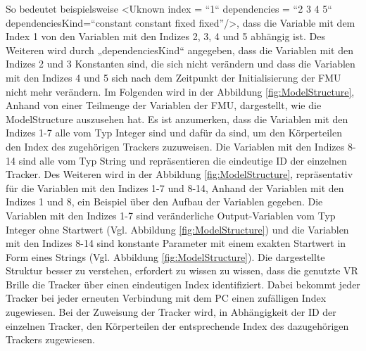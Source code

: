 So bedeutet beispielsweise <Uknown index  = “1“ dependencies = “2 3 4 5“ dependenciesKind=“constant constant fixed fixed”/>, dass die Variable mit dem Index 1 von den Variablen mit den Indizes 2, 3, 4 und 5 abhängig ist. Des Weiteren wird durch „dependenciesKind“ angegeben, dass die Variablen mit den Indizes 2 und 3 Konstanten sind, die sich nicht verändern und dass die Variablen mit den Indizes 4 und 5 sich nach dem Zeitpunkt der Initialisierung der FMU nicht mehr verändern.
\newline\newline
Im Folgenden wird in der Abbildung \ref{fig:ModelStructure}, Anhand von einer Teilmenge der Variablen der FMU, dargestellt, wie die ModelStructure auszusehen hat. Es ist anzumerken, dass die Variablen mit den Indizes 1-7 alle vom Typ Integer sind und dafür da sind, um den Körperteilen den Index des zugehörigen Trackers zuzuweisen. Die Variablen mit den Indizes 8-14 sind alle vom Typ String und repräsentieren die eindeutige ID der einzelnen Tracker. Des Weiteren wird in der Abbildung \ref{fig:ModelStructure}, repräsentativ für die Variablen mit den Indizes 1-7 und 8-14, Anhand der Variablen mit den Indizes 1 und 8, ein Beispiel über den Aufbau der Variablen gegeben. Die Variablen mit den Indizes 1-7 sind veränderliche Output-Variablen vom Typ Integer ohne Startwert (Vgl. Abbildung \ref{fig:ModelStructure}) und die Variablen mit den Indizes 8-14 sind konstante Parameter mit einem exakten Startwert in Form eines Strings (Vgl. Abbildung \ref{fig:ModelStructure}). Die dargestellte Struktur besser zu verstehen, erfordert zu wissen zu wissen, dass die genutzte VR Brille die Tracker über einen eindeutigen Index identifiziert. Dabei bekommt jeder Tracker bei jeder erneuten Verbindung mit dem PC einen zufälligen Index zugewiesen. Bei der Zuweisung der Tracker wird, in Abhängigkeit der ID der einzelnen Tracker, den Körperteilen der entsprechende Index des dazugehörigen Trackers zugewiesen.

